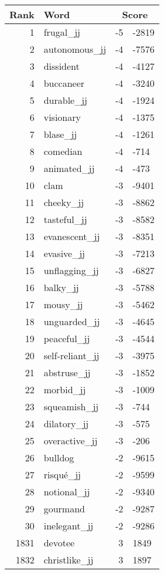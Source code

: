 \begin{longtable}[!htbp]{| rlr@{.}l |}
    \hline
    \textbf{Rank} & \textbf{Word} & \multicolumn{2}{c|}{\textbf{Score}} \\
    \hline
    \endhead
    1 & frugal\_jj & -5 & -2819 \\
    2 & autonomous\_jj & -4 & -7576 \\
    3 & dissident & -4 & -4127 \\
    4 & buccaneer & -4 & -3240 \\
    5 & durable\_jj & -4 & -1924 \\
    6 & visionary & -4 & -1375 \\
    7 & blase\_jj & -4 & -1261 \\
    8 & comedian & -4 & -714 \\
    9 & animated\_jj & -4 & -473 \\
    10 & clam & -3 & -9401 \\
    11 & cheeky\_jj & -3 & -8862 \\
    12 & tasteful\_jj & -3 & -8582 \\
    13 & evanescent\_jj & -3 & -8351 \\
    14 & evasive\_jj & -3 & -7213 \\
    15 & unflagging\_jj & -3 & -6827 \\
    16 & balky\_jj & -3 & -5788 \\
    17 & mousy\_jj & -3 & -5462 \\
    18 & unguarded\_jj & -3 & -4645 \\
    19 & peaceful\_jj & -3 & -4544 \\
    20 & self-reliant\_jj & -3 & -3975 \\
    21 & abstruse\_jj & -3 & -1852 \\
    22 & morbid\_jj & -3 & -1009 \\
    23 & squeamish\_jj & -3 & -744 \\
    24 & dilatory\_jj & -3 & -575 \\
    25 & overactive\_jj & -3 & -206 \\
    26 & bulldog & -2 & -9615 \\
    27 & risqué\_jj & -2 & -9599 \\
    28 & notional\_jj & -2 & -9340 \\
    29 & gourmand & -2 & -9287 \\
    30 & inelegant\_jj & -2 & -9286 \\
    1831 & devotee & 3 & 1849 \\
    1832 & christlike\_jj & 3 & 1897 \\

\end{longtable}
